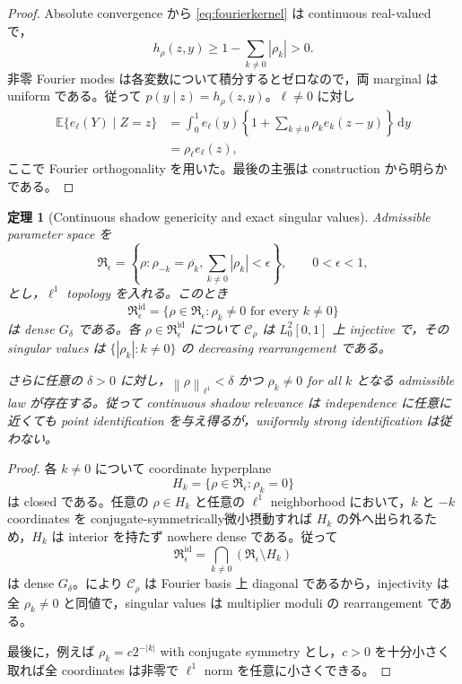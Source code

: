 \documentclass[11pt,a4paper]{ltjsarticle}
\newtheorem{theorem}{定理}[section]
\theoremstyle{remark}
\newcommand{\E}{\mathbb E}
\newcommand{\dd}{\,\mathrm d}
\newcommand{\abs}[1]{\left|#1\right|}
\newcommand{\norm}[1]{\left\lVert#1\right\rVert}
\newcommand{\Cop}{\mathscr C}
\begin{document}
\begin{proof}
Absolute convergence から \eqref{eq:fourierkernel} は continuous real-valued で，
\[
h_\rho(z,y)
\ge1-\sum_{k\ne0}\abs{\rho_k}>0.
\]
非零 Fourier modes は各変数について積分するとゼロなので，両 marginal は uniform である。従って $p(y\mid z)=h_\rho(z,y)$。$\ell\ne0$ に対し
\begin{align*}
\E\{e_\ell(Y)\mid Z=z\}
&=\int_0^1e_\ell(y)
\left\{1+\sum_{k\ne0}\rho_ke_k(z-y)\right\}\dd y\\
&=\rho_\ell e_\ell(z),
\end{align*}
ここで Fourier orthogonality を用いた。最後の主張は construction から明らかである。
\end{proof}

\begin{theorem}[Continuous shadow genericity and exact singular values]\label{thm:fouriershadowgeneric}
Admissible parameter space を
\[
\mathfrak R_\epsilon
=\left\{\rho:\rho_{-k}=\overline{\rho_k},
\sum_{k\ne0}\abs{\rho_k}<\epsilon\right\},
\qquad0<\epsilon<1,
\]
とし，$\ell^1$ topology を入れる。このとき
\begin{equation}
\mathfrak R_\epsilon^{\mathrm{id}}
=\{\rho\in\mathfrak R_\epsilon:\rho_k\ne0\text{ for every }k\ne0\}
\label{eq:rhoidset}
\end{equation}
は dense $G_\delta$ である。各 $\rho\in\mathfrak R_\epsilon^{\mathrm{id}}$ について $\Cop_\rho$ は $L^2_0[0,1]$ 上 injective で，その singular values は $\{|\rho_k|:k\ne0\}$ の decreasing rearrangement である。

さらに任意の $\delta>0$ に対し，$\norm\rho_{\ell^1}<\delta$ かつ $\rho_k\ne0$ for all $k$ となる admissible law が存在する。従って continuous shadow relevance は independence に任意に近くても point identification を与え得るが，uniformly strong identification は従わない。
\end{theorem}

\begin{proof}
各 $k\ne0$ について coordinate hyperplane
\[
H_k=\{\rho\in\mathfrak R_\epsilon:\rho_k=0\}
\]
は closed である。任意の $\rho\in H_k$ と任意の $\ell^1$ neighborhood において，$k$ と $-k$ coordinates を conjugate-symmetrically微小摂動すれば $H_k$ の外へ出られるため，$H_k$ は interior を持たず nowhere dense である。従って
\[
\mathfrak R_\epsilon^{\mathrm{id}}
=\bigcap_{k\ne0}(\mathfrak R_\epsilon\setminus H_k)
\]
は dense $G_\delta$。により $\Cop_\rho$ は Fourier basis 上 diagonal であるから，injectivity は全 $\rho_k\ne0$ と同値で，singular values は multiplier moduli の rearrangement である。

最後に，例えば $\rho_k=c2^{-|k|}$ with conjugate symmetry とし，$c>0$ を十分小さく取れば全 coordinates は非零で $\ell^1$ norm を任意に小さくできる。
\end{proof}
\end{document}
